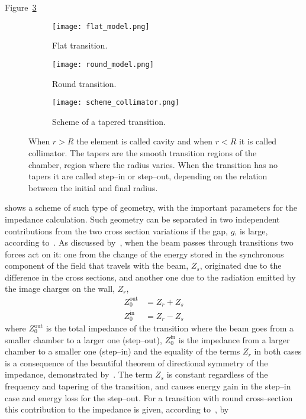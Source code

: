     Figure~\ref{fig:collimator_geometry}
    \begin{figure}
        \centering
        \begin{subfigure}[b]{0.24\textwidth}
            \centering
            \texttt{[image: flat\_model.png]}
            \caption{Flat transition.}
            \label{fig:flat_transition}
        \end{subfigure}
        \begin{subfigure}[b]{0.24\textwidth}
            \centering
            \texttt{[image: round\_model.png]}
            \caption{Round transition.}
            \label{fig:round_transition}
        \end{subfigure}
        \begin{subfigure}[b]{0.5\textwidth}
            \centering
            \texttt{[image: scheme\_collimator.png]}
            \caption{Scheme of a tapered transition.}
            \label{fig:collimator_geometry}
        \end{subfigure}
        \caption[Scheme of a tapered transition.]{When $r>R$ the element is called cavity and when $r<R$ it is called collimator. The tapers are the smooth transition regions of the chamber, region where the radius varies. When the transition has no tapers it are called step--in or step--out, depending on the relation between the initial and final radius.}
        \label{fig:collimator_geometry_types}
    \end{figure}
    shows a scheme of such type of geometry, with the important parameters for the impedance calculation. Such geometry can be separated in two independent contributions from the two cross section variations if the gap, $g$, is large, according to~. As discussed by~, when the beam passes through transitions two forces act on it: one from the change of the energy stored in the synchronous component of the field that travels with the beam, $Z_s$, originated due to the difference in the cross sections, and another one due to the radiation emitted by the image charges on the wall, $Z_r$,
    \begin{subequations}
        \begin{align}
            Z_0^\text{out} &= Z_r + Z_s\\
            Z_0^\text{in}  &= Z_r - Z_s
        \end{align}
    \end{subequations}
    where $Z_0^\text{out}$ is the total impedance of the transition where the beam goes from a smaller chamber to a larger one (step--out), $Z_0^\text{in}$ is the impedance from a larger chamber to a smaller one (step--in) and the equality of the terms $Z_r$ in both cases is a consequence of the beautiful theorem of directional symmetry of the impedance, demonstrated by~. The term $Z_s$ is constant regardless of the frequency and tapering of the transition, and causes energy gain in the step--in case and energy loss for the step--out. For a transition with round cross--section this contribution to the impedance is given, according to~, by
